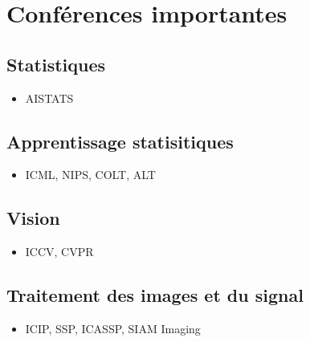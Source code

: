 \section{Conférences importantes}



\subsection{Statistiques}

\begin{itemize}
 \item AISTATS
\end{itemize}

\subsection{Apprentissage statisitiques}
\begin{itemize}
 \item ICML, NIPS, COLT, ALT
\end{itemize}
\subsection{Vision}

\begin{itemize}
 \item ICCV, CVPR 
\end{itemize}


\subsection{Traitement des images et du signal}

\begin{itemize}
 \item ICIP, SSP, ICASSP, SIAM Imaging
\end{itemize}

